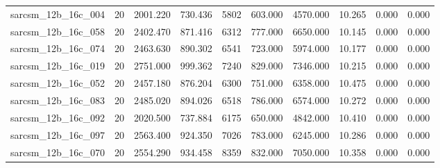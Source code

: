 \begin{tabular}{lrrrrrrrrr}
sarcsm\_12b\_16c\_004 & 20 & 2001.220 & 730.436 & 5802 & 603.000 & 4570.000 & 10.265 & 0.000 & 0.000 \\
sarcsm\_12b\_16c\_058 & 20 & 2402.470 & 871.416 & 6312 & 777.000 & 6650.000 & 10.145 & 0.000 & 0.000 \\
sarcsm\_12b\_16c\_074 & 20 & 2463.630 & 890.302 & 6541 & 723.000 & 5974.000 & 10.177 & 0.000 & 0.000 \\
sarcsm\_12b\_16c\_019 & 20 & 2751.000 & 999.362 & 7240 & 829.000 & 7346.000 & 10.215 & 0.000 & 0.000 \\
sarcsm\_12b\_16c\_052 & 20 & 2457.180 & 876.204 & 6300 & 751.000 & 6358.000 & 10.475 & 0.000 & 0.000 \\
sarcsm\_12b\_16c\_083 & 20 & 2485.020 & 894.026 & 6518 & 786.000 & 6574.000 & 10.272 & 0.000 & 0.000 \\
sarcsm\_12b\_16c\_092 & 20 & 2020.500 & 737.884 & 6175 & 650.000 & 4842.000 & 10.410 & 0.000 & 0.000 \\
sarcsm\_12b\_16c\_097 & 20 & 2563.400 & 924.350 & 7026 & 783.000 & 6245.000 & 10.286 & 0.000 & 0.000 \\
sarcsm\_12b\_16c\_070 & 20 & 2554.290 & 934.458 & 8359 & 832.000 & 7050.000 & 10.358 & 0.000 & 0.000 \\
\bottomrule
\end{tabular}
